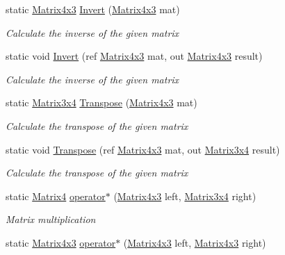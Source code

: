 \begin{DoxyCompactItemize}
static \hyperlink{struct_open_t_k_1_1_matrix4x3}{Matrix4x3} \hyperlink{struct_open_t_k_1_1_matrix4x3_abe99f5143051cc7c6dfe17ee7c0f2473}{Invert} (\hyperlink{struct_open_t_k_1_1_matrix4x3}{Matrix4x3} mat)
\begin{DoxyCompactList}\small\item\em Calculate the inverse of the given matrix \end{DoxyCompactList}\item 
static void \hyperlink{struct_open_t_k_1_1_matrix4x3_a5fb4cd459eb1af03dc80a4ebd6989b19}{Invert} (ref \hyperlink{struct_open_t_k_1_1_matrix4x3}{Matrix4x3} mat, out \hyperlink{struct_open_t_k_1_1_matrix4x3}{Matrix4x3} result)
\begin{DoxyCompactList}\small\item\em Calculate the inverse of the given matrix \end{DoxyCompactList}\item 
static \hyperlink{struct_open_t_k_1_1_matrix3x4}{Matrix3x4} \hyperlink{struct_open_t_k_1_1_matrix4x3_a94468d0c45e4dce32434db7aaa6b960c}{Transpose} (\hyperlink{struct_open_t_k_1_1_matrix4x3}{Matrix4x3} mat)
\begin{DoxyCompactList}\small\item\em Calculate the transpose of the given matrix \end{DoxyCompactList}\item 
static void \hyperlink{struct_open_t_k_1_1_matrix4x3_ae3a6d8315d3b908e9c8e79d0b6e6ab4b}{Transpose} (ref \hyperlink{struct_open_t_k_1_1_matrix4x3}{Matrix4x3} mat, out \hyperlink{struct_open_t_k_1_1_matrix3x4}{Matrix3x4} result)
\begin{DoxyCompactList}\small\item\em Calculate the transpose of the given matrix \end{DoxyCompactList}\item 
static \hyperlink{struct_open_t_k_1_1_matrix4}{Matrix4} \hyperlink{struct_open_t_k_1_1_matrix4x3_a900d5b8236f9b714c1326f85b6a5d258}{operator$\ast$} (\hyperlink{struct_open_t_k_1_1_matrix4x3}{Matrix4x3} left, \hyperlink{struct_open_t_k_1_1_matrix3x4}{Matrix3x4} right)
\begin{DoxyCompactList}\small\item\em Matrix multiplication \end{DoxyCompactList}\item 
static \hyperlink{struct_open_t_k_1_1_matrix4x3}{Matrix4x3} \hyperlink{struct_open_t_k_1_1_matrix4x3_a5c96a6952411f3ee6d6b892f16655da4}{operator$\ast$} (\hyperlink{struct_open_t_k_1_1_matrix4x3}{Matrix4x3} left, \hyperlink{struct_open_t_k_1_1_matrix4x3}{Matrix4x3} right)

\end{DoxyCompactItemize}
